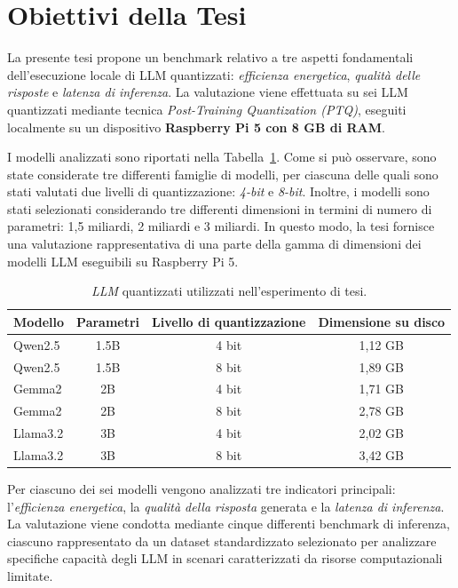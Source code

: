 \section{Obiettivi della Tesi}

La presente tesi propone un benchmark relativo a tre aspetti fondamentali
dell'esecuzione locale di LLM quantizzati: \textit{efficienza energetica},
\textit{qualità delle risposte} e \textit{latenza di inferenza}. La valutazione
viene effettuata su sei LLM quantizzati mediante tecnica \textit{Post-Training
Quantization (PTQ)}, eseguiti localmente su un dispositivo
\textbf{Raspberry Pi 5 con 8 GB di RAM}.

I modelli analizzati sono riportati nella Tabella~\ref{tab:llm}. Come si può
osservare, sono state considerate tre differenti famiglie di modelli, per
ciascuna delle quali sono stati valutati due livelli di quantizzazione:
\textit{4-bit} e \textit{8-bit}. Inoltre, i modelli sono stati selezionati
considerando tre differenti dimensioni in termini di numero di parametri:
1,5 miliardi, 2 miliardi e 3 miliardi. In questo modo, la tesi fornisce una
valutazione rappresentativa di una parte della gamma di dimensioni dei modelli
LLM eseguibili su Raspberry Pi 5.

\begin{table}[htbp]
    \centering
    \begin{tabular}{lccc}
        \hline
        Modello & Parametri & Livello di quantizzazione & Dimensione su disco \\
        \hline
        Qwen2.5 & 1.5B & 4 bit & 1,12 GB \\
        Qwen2.5 & 1.5B & 8 bit & 1,89 GB \\
        Gemma2 & 2B & 4 bit & 1,71 GB \\
        Gemma2 & 2B & 8 bit & 2,78 GB \\
        Llama3.2 & 3B & 4 bit & 2,02 GB \\
        Llama3.2 & 3B & 8 bit & 3,42 GB \\
        \hline
    \end{tabular}
    \caption{\textit{LLM} quantizzati utilizzati nell'esperimento di tesi.}
    \label{tab:llm}
\end{table}

Per ciascuno dei sei modelli vengono analizzati tre indicatori principali:
l'\textit{efficienza energetica}, la \textit{qualità della risposta} generata e la \textit{latenza di
inferenza}. La valutazione viene condotta mediante cinque differenti benchmark
di inferenza, ciascuno rappresentato da un dataset standardizzato selezionato
per analizzare specifiche capacità degli LLM in scenari caratterizzati da
risorse computazionali limitate.

